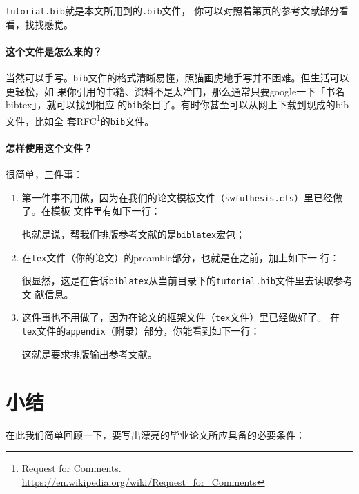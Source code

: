 \texttt{tutorial.bib}就是本文所用到的\texttt{.bib}文件，
你可以对照着第\pageref{p:ref}页的参考文献部分看看，找找感觉。

\paragraph*{这个文件是怎么来的？}

当然可以手写。\texttt{bib}文件的格式清晰易懂，照猫画虎地手写并不困难。但生活可以更轻松，如
果你引用的书籍、资料不是太冷门，那么通常只要google一下「书名 bibtex」，就可以找到相应
的\texttt{bib}条目了。有时你甚至可以从网上下载到现成的bib文件，比如全
套RFC\footnote{Request for
  Comments. \url{https://en.wikipedia.org/wiki/Request_for_Comments}}的\texttt{bib}文件。

\paragraph*{怎样使用这个文件？}

很简单，三件事：

\begin{enumerate}
\item 第一件事不用做，因为在我们的论文模板文件（\texttt{swfuthesis.cls}）里已经做了。在模板
  文件里有如下一行：
\begin{latexcode}
\RequirePackage[backend=biber,style=gb7714-2015]{biblatex}
\end{latexcode}
  也就是说，帮我们排版参考文献的是\texttt{biblatex}宏包；
\item 在\texttt{tex}文件（你的论文）的preamble部分，也就是在\ltx{\document}之前，加上如下一
  行：
\begin{latexcode}

\end{latexcode}
  很显然，这是在告诉\texttt{biblatex}从当前目录下的\texttt{tutorial.bib}文件里去读取参考文
  献信息。
\item 这件事也不用做了，因为在论文的框架文件（\texttt{tex}文件）里已经做好了。
  在\texttt{tex}文件的\texttt{appendix}（附录）部分，你能看到如下一行：
\begin{latexcode}
\makebib
\end{latexcode}
  这就是要求排版输出参考文献。
\end{enumerate}

\section{小结}

在此我们简单回顾一下，要写出漂亮的毕业论文所应具备的必要条件：


